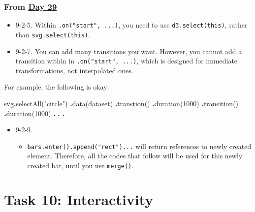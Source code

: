 \documentclass[
]{book}
\newenvironment{Shaded}{\begin{snugshade}}{\end{snugshade}}
\newcommand{\DecValTok}[1]{\textcolor[rgb]{0.00,0.00,0.81}{#1}}
\newcommand{\FunctionTok}[1]{\textcolor[rgb]{0.00,0.00,0.00}{#1}}
\newcommand{\NormalTok}[1]{#1}
\newcommand{\OperatorTok}[1]{\textcolor[rgb]{0.81,0.36,0.00}{\textbf{#1}}}
\newcommand{\StringTok}[1]{\textcolor[rgb]{0.31,0.60,0.02}{#1}}
\providecommand{\tightlist}{%
  \setlength{\itemsep}{0pt}\setlength{\parskip}{0pt}}
\begin{document}
\hypertarget{from-day-29-2}{%
\subsection{\texorpdfstring{From \href{https://observablehq.com/@hongtaoh/day-twenty-nine-2020-09-22}{Day 29}}{From Day 29}}\label{from-day-29-2}}

\begin{itemize}
\item
  9-2-5. Within \texttt{.on("start",\ ...)}, you need to use \texttt{d3.select(this)}, rather than \texttt{svg.select(this)}.
\item
  9-2-7. You can add many transitions you want. However, you cannot add a transition within in \texttt{.on("start",\ ...)}, which is designed for immediate transformations, not interpolated ones.
\end{itemize}

For example, the following is okay:

\begin{Shaded}
\begin{Highlighting}[]
\NormalTok{svg}\OperatorTok{.}\FunctionTok{selectAll}\NormalTok{(}\StringTok{"circle"}\NormalTok{)}
     \OperatorTok{.}\FunctionTok{data}\NormalTok{(dataset)}
     \OperatorTok{.}\FunctionTok{transtion}\NormalTok{()}
     \OperatorTok{.}\FunctionTok{duration}\NormalTok{(}\DecValTok{1000}\NormalTok{)}
     \OperatorTok{.}\FunctionTok{transition}\NormalTok{()}
     \OperatorTok{.}\FunctionTok{duration}\NormalTok{(}\DecValTok{1000}\NormalTok{)}
     \OperatorTok{.}
     \OperatorTok{.}
     \OperatorTok{.}
\end{Highlighting}
\end{Shaded}

\begin{itemize}
\tightlist
\item
  9-2-9.

  \begin{itemize}
  \tightlist
  \item
    \texttt{bars.enter().append("rect")...} will return references to newly created element. Therefore, all the codes that follow will be used for this newly created bar, until you use \texttt{merge()}.
  \end{itemize}
\end{itemize}

\hypertarget{task10}{%
\chapter{Task 10: Interactivity}\label{task10}}
\end{document}
